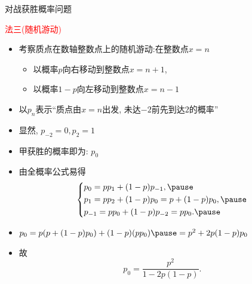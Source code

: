 \documentclass[Prob-All.tex]{subfiles}
\begin{document}
\begin{frame}{对战获胜概率问题}
	\begin{jieda}
		\textcolor{red}{法三(随机游动)}
		\begin{itemize}[<+-|alert@+>]
			\item 考察质点在数轴整数点上的随机游动:在整数点$x=n$
			\begin{itemize}[<+-|alert@+>]
				\item 以概率$p$向右移动到整数点$x=n+1$,
				\item 以概率$1-p$向左移动到整数点$x=n-1$
			\end{itemize}
			\item 以$p_n$表示“质点由$x=n$出发, 未达$-2$前先到达$2$的概率”
			\item 显然, $p_{-2}=0,p_2=1$
			\item 甲获胜的概率即为: $p_0$
			\item 由全概率公式易得
			\begin{equation}
				\left\{
				\begin{aligned}
					&p_0=pp_1+(1-p)p_{-1}, \pause \\ \notag
					&p_1=pp_2+(1-p)p_0=p+(1-p)p_0, \pause \\
					&p_{-1}=pp_0+(1-p)p_{-2}=pp_0.\pause
				\end{aligned}
				\right.
			\end{equation}\pause
			\item $p_0=p(p+(1-p)p_0)+(1-p)(pp_0)\pause =p^2+2p(1-p)p_0$\pause
			\item 故 $$p_0=\dfrac{p^2}{1-2p(1-p)}.$$
		\end{itemize}
	\end{jieda}
\end{frame}
\end{document}
